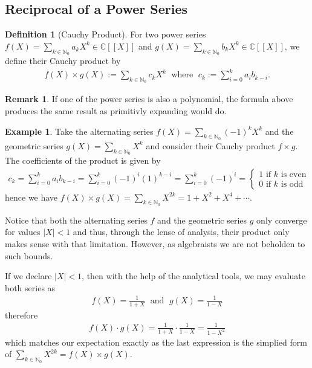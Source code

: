 \documentclass[a4paper]{article}
\theoremstyle{definition}
\newtheorem{definition}{Definition}[]
\newtheorem{example}{Example}[definition]
\newtheorem*{remark}{Remark}
\begin{document}
\subsection{Reciprocal of a Power Series}
\begin{definition}[Cauchy Product]
    For two power series \(f(X) = \sum_{k \in \mathbb{N}_0} a_k X^k \in \mathbb{C}[[X]]\) and \(g(X) = \sum_{k \in \mathbb{N}_0} b_k X^k \in \mathbb{C}[[X]]\), we define their Cauchy product by
    \begin{align*}
        f(X) \times g(X) := \sum_{k \in \mathbb{N}_0} c_k X^k \; \text{ where } \; c_k := \sum_{i = 0}^{k}a_i b_{k - i} \text{.}
    \end{align*}
\end{definition}
%
\begin{remark}
    If one of the power series is also a polynomial, the formula above produces the same result as primitivly expanding would do.
\end{remark}
%
\begin{example}
    Take the alternating series \(f(X) = \sum_{k \in \mathbb{N}_0} (-1)^k X^k\) and the geometric series \(g(X) = \sum_{k \in \mathbb{N}_0} X^k\) and consider their Cauchy product \(f \times g\). The coefficients of the product is given by
    \begin{align*}
        c_k = \sum_{i=0}^k a_i b_{k-i} = \sum_{i=0}^k (-1)^{i} (1)^{k-i} = \sum_{i=0}^{k} (-1)^{i} = \begin{cases}
            1 \text{ if \(k\) is even} \\
            0 \text{ if \(k\) is odd}
        \end{cases}
    \end{align*}
    hence we have \(f(X) \times g(X) = \sum_{k \in \mathbb{N}_0} X^{2k} = 1 + X^2 + X^4 + \cdots\).

    Notice that both the alternating series \(f\) and the geometric series \(g\) only converge for values \(|X| < 1\) and thus, through the lense of analysis, their product only makes sense with that limitation. However, as algebraists we are not beholden to such bounds.

    If we declare \(|X| < 1\), then with the help of the analytical tools, we may evaluate both series as
    \begin{align*}
        f(X) = \frac{1}{1 + X} \; \text{ and } \; g(X) = \frac{1}{1 - X}
    \end{align*}
    therefore
    \begin{align*}
        f(X) \cdot g(X) = \frac{1}{1 + X} \cdot \frac{1}{1 - X} = \frac{1}{1 - X^2}
    \end{align*}
    which matches our expectation exactly as the last expression is the simplied form of \(\sum_{k \in \mathbb{N}_0} X^{2k} = f(X) \times g(X)\).
\end{example}
\end{document}
